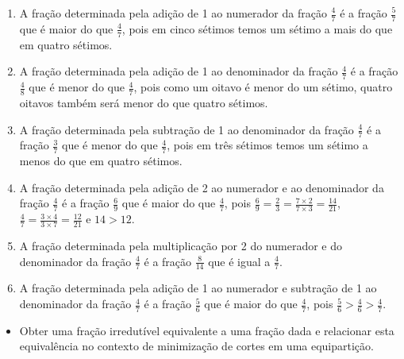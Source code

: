 \begin{solucao}{}{}


\begin{enumerate} [\quad a)] %
    \item       A fração determinada pela adição de 1 ao numerador da fração
  $\frac{4}{7}$       é a fração       $\frac{5}{7}$       que é maior do que
   $\frac{4}{7}$, pois em cinco sétimos temos um sétimo a mais do que em quatro
sétimos.


\newpage
    \item       A fração determinada pela adição de 1 ao denominador da fração
    $\frac{4}{7}$       é a fração       $\frac{4}{8}$       que é menor do que
     $\frac{4}{7}$, pois como um oitavo é menor do um sétimo, quatro oitavos
também será menor do que quatro sétimos.
    \item       A fração determinada pela subtração de 1 ao denominador da
fração       $\frac{4}{7}$       é a fração       $\frac{3}{7}$       que é
menor do que       $\frac{4}{7}$, pois em três sétimos temos um sétimo a menos
do que em quatro sétimos.
    \item       A fração determinada pela adição de 2 ao numerador e ao
denominador da fração       $\frac{4}{7}$       é a fração       $\frac{6}{9}$
    que é maior do que       $\frac{4}{7}$, pois       $\frac{6}{9} =
\frac{2}{3} = \frac{7 \times 2}{7 \times 3} = \frac{14}{21}$,       $\frac{4}{7}
= \frac{3 \times 4}{3 \times 7} = \frac{12}{21}$       e       $14 > 12$.
    \item       A fração determinada pela multiplicação por 2 do numerador e do
denominador da fração       $\frac{4}{7}$       é a fração       $\frac{8}{14}$
     que é igual a       $\frac{4}{7}$.
    \item       A fração determinada pela adição de 1 ao numerador e subtração
de 1 ao denominador da fração       $\frac{4}{7}$       é a fração
$\frac{5}{6}$       que é maior do que       $\frac{4}{7}$, pois
$\frac{5}{6} > \frac{4}{6} > \frac{4}{7}$.
\end{enumerate} %

\end{solucao}



\begin{objetivos}[label=chap4-ativ16]{}{}
\begin{itemize} %
    \item       Obter uma fração irredutível equivalente a uma fração dada e
relacionar esta equivalência no contexto de minimização de cortes em uma
equipartição.
\end{itemize} %
\end{objetivos}

